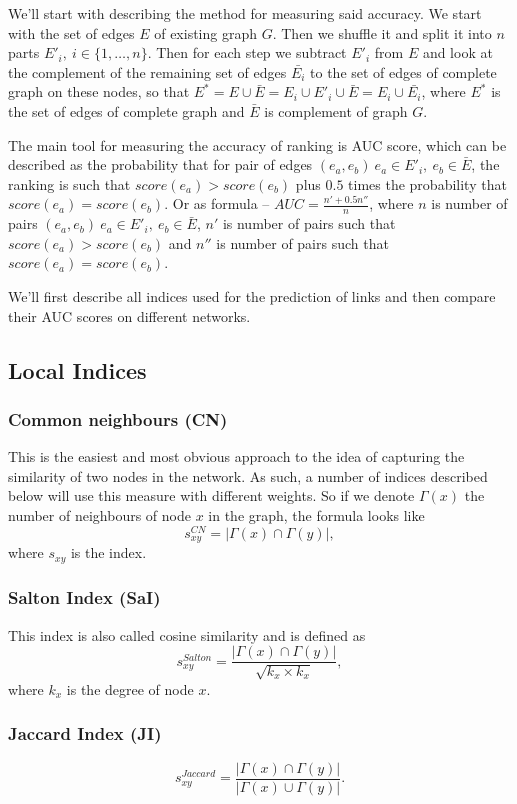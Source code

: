 \documentclass{llncs}
\begin{document}
We'll start with describing the method for measuring said accuracy. We start with the set of edges $E$ of existing graph $G$. Then we shuffle it and split it into $n$ parts $E'_i, \ i \in \{1, \ldots, n\}$. Then for each step we subtract $E'_i$ from $E$ and look at the complement of the remaining set of edges $\bar{E_i}$ to the set of edges of complete graph on these nodes, so that $E^* = E \cup \bar{E} = E_i \cup E'_i \cup \bar{E} = E_i \cup \bar{E_i}$, where $E^*$ is the set of edges of complete graph and $\bar{E}$ is complement of graph $G$.

The main tool for measuring the accuracy of ranking is AUC score, which can be described as the probability that for pair of edges $(e_a, e_b) \ e_a \in E'_i, \ e_b \in \bar{E}$, the ranking is such that $score(e_a) > score(e_b)$ plus $0.5$ times the probability that $score(e_a) = score(e_b)$. Or as formula -- $AUC = \frac{n' + 0.5 n''}{n}$, where $n$ is number of pairs $(e_a, e_b) \ e_a \in E'_i, \ e_b \in \bar{E}$, $n'$ is number of pairs such that $score(e_a) > score(e_b)$ and $n''$ is number of pairs such that $score(e_a) = score(e_b)$.

We'll first describe all indices used for the prediction of links and then compare their AUC scores on different networks.
%
\subsection{Local Indices}
%
\subsubsection{Common neighbours (CN)}
%
This is the easiest and most obvious approach to the idea of capturing the similarity of two nodes in the network. As such, a number of indices described below will use this measure with different weights. So if we denote $\Gamma(x)$ the number of neighbours of node $x$ in the graph, the formula looks like
$$s_{xy}^{CN} = |\Gamma(x) \cap \Gamma(y)|,$$
where $s_{xy}$ is the index.
%
\subsubsection{Salton Index (SaI)}
%
This index is also called cosine similarity and is defined as
$$s_{xy}^{Salton} = \frac{|\Gamma(x) \cap \Gamma(y)|}{\sqrt{k_x \times k_x}},$$
where $k_x$ is the degree of node $x$.
%
\subsubsection{Jaccard Index (JI)}
%
$$s_{xy}^{Jaccard} = \frac{|\Gamma(x) \cap \Gamma(y)|}{|\Gamma(x) \cup \Gamma(y)|}.$$
%
\end{document}
